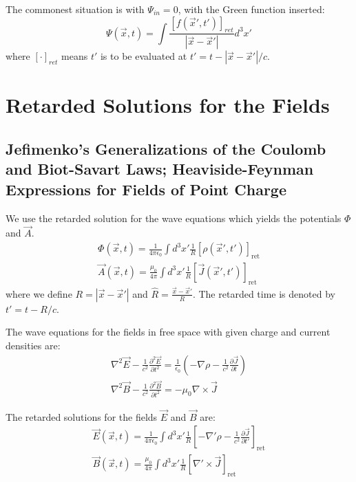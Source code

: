 \documentclass{article}
\begin{document}
	The commonest situation is with $\Psi_{in} = 0$, with the Green function inserted:
	$$ \Psi(\vec{x}, t) = \int \frac{[f(\vec{x}', t')]_{ret}}{|\vec{x}-\vec{x}'|} d^3x' $$
	where $[ \cdot ]_{ret}$ means $t'$ is to be evaluated at $t' = t - |\vec{x}-\vec{x}'|/c$.
	\section{Retarded Solutions for the Fields}
	\subsection{Jefimenko's Generalizations of the Coulomb and Biot-Savart Laws; Heaviside-Feynman Expressions for Fields of Point Charge}
	
	We use the retarded solution for the wave equations which yields the potentials \(\Phi\) and \(\vec{A}\).
	\begin{gather}
		\Phi(\vec{x}, t) = \frac{1}{4\pi\epsilon_0} \int d^3x' \frac{1}{R} \left[ \rho(\vec{x}', t') \right]_{\text{ret}} \\
		\vec{A}(\vec{x}, t) = \frac{\mu_0}{4\pi} \int d^3x' \frac{1}{R} \left[ \vec{J}(\vec{x}', t') \right]_{\text{ret}}
	\end{gather}
	where we define \(R = |\vec{x} - \vec{x}'|\) and \(\hat{R} = \frac{\vec{x} - \vec{x}'}{R}\). The retarded time is denoted by \(t' = t - R/c\).
	
	The wave equations for the fields in free space with given charge and current densities are:
	\begin{gather}
		\nabla^2\vec{E} - \frac{1}{c^2}\frac{\partial^2\vec{E}}{\partial t^2} = \frac{1}{\epsilon_0} \left( -\nabla\rho - \frac{1}{c^2}\frac{\partial\vec{J}}{\partial t} \right) \\
		\nabla^2\vec{B} - \frac{1}{c^2}\frac{\partial^2\vec{B}}{\partial t^2} = -\mu_0 \nabla \times \vec{J}
	\end{gather}
	
	The retarded solutions for the fields \(\vec{E}\) and \(\vec{B}\) are:
	\begin{gather}
		\vec{E}(\vec{x}, t) = \frac{1}{4\pi\epsilon_0} \int d^3x' \frac{1}{R} \left[ -\nabla'\rho - \frac{1}{c^2}\frac{\partial\vec{J}}{\partial t'} \right]_{\text{ret}} \\
		\vec{B}(\vec{x}, t) = \frac{\mu_0}{4\pi} \int d^3x' \frac{1}{R} \left[ \nabla' \times \vec{J} \right]_{\text{ret}}
	\end{gather}
	
\end{document}
